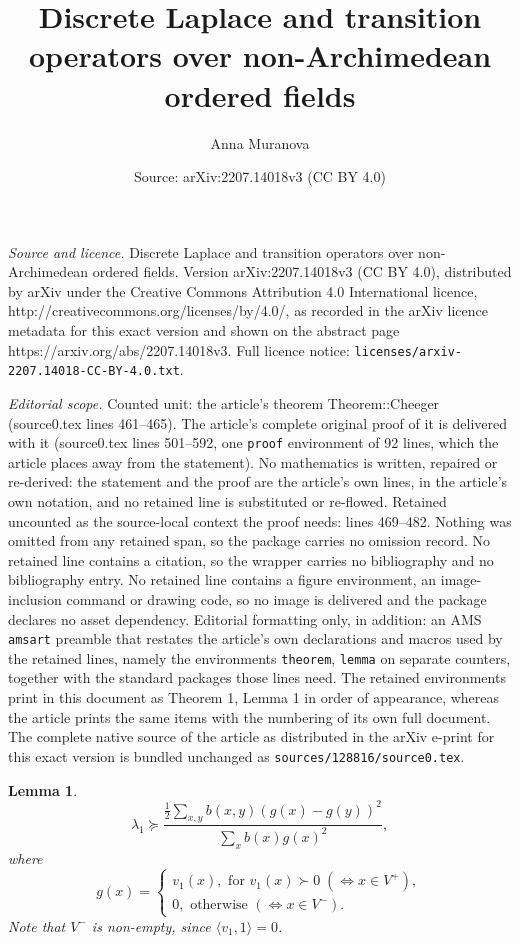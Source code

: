 \documentclass[10pt,a4paper]{amsart}
\title{Discrete Laplace and transition operators over non-Archimedean ordered fields}
\author{Anna Muranova}
\date{Source: arXiv:2207.14018v3 (CC BY 4.0)}
\newtheorem{lemma}{Lemma}
\newcommand{\weight}{b}
\begin{document}
\maketitle

\noindent\emph{Source and licence.} Discrete Laplace and transition operators over non-Archimedean ordered fields. Version arXiv:2207.14018v3 (CC BY 4.0), distributed by arXiv under the Creative Commons Attribution 4.0 International licence, http://creativecommons.org/licenses/by/4.0/, as recorded in the arXiv licence metadata for this exact version and shown on the abstract page https://arxiv.org/abs/2207.14018v3. Full licence notice: \texttt{licenses/arxiv-2207.14018-CC-BY-4.0.txt}.\par\smallskip

\noindent\textit{Editorial scope.} Counted unit: the article's theorem Theorem::Cheeger (source0.tex lines 461--465). The article's complete original proof of it is delivered with it (source0.tex lines 501--592, one \texttt{proof} environment of 92 lines, which the article places away from the statement). No mathematics is written, repaired or re-derived: the statement and the proof are the article's own lines, in the article's own notation, and no retained line is substituted or re-flowed.  Retained uncounted as the source-local context the proof needs: lines 469--482.  Nothing was omitted from any retained span, so the package carries no omission record.  No retained line contains a citation, so the wrapper carries no bibliography and no bibliography entry.  No retained line contains a figure environment, an image-inclusion command or drawing code, so no image is delivered and the package declares no asset dependency.  Editorial formatting only, in addition: an AMS \texttt{amsart} preamble that restates the article's own declarations and macros used by the retained lines, namely the environments \texttt{theorem}, \texttt{lemma} on separate counters, together with the standard packages those lines need.  The retained environments print in this document as Theorem 1, Lemma 1 in order of appearance, whereas the article prints the same items with the numbering of its own full document.  The complete native source of the article as distributed in the arXiv e-print for this exact version is bundled unchanged as \texttt{sources/128816/source0.tex}.
\begin{lemma}\label{Lemma:lambda1g}
\begin{equation}\label{lambda1g}
\lambda_1\succeq \dfrac{\frac{1}{2}\sum_{x,y}\weight (x,y)(g(x)-g(y))^2}{\sum_x \weight (x)g(x)^2},
\end{equation}
where
\begin{equation*}
g(x)=
\begin{cases}
v_1(x), \mbox{ for }v_1(x)\succ 0\; (\Leftrightarrow x\in V^+),\\
0, \mbox{ otherwise } (\Leftrightarrow x\in V^-).
\end{cases}
\end{equation*}
Note that $V^-$ is non-empty, since $\langle v_1, 1\rangle=0$.
\end{lemma}
\end{document}
